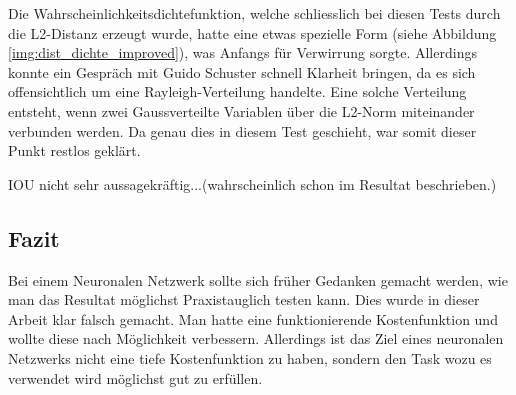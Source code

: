 Die Wahrscheinlichkeitsdichtefunktion, welche schliesslich bei diesen Tests durch die L2-Distanz erzeugt wurde, hatte eine etwas spezielle Form (siehe Abbildung \ref{img:dist_dichte_improved}), was Anfangs für Verwirrung sorgte. 
Allerdings konnte ein Gespräch mit Guido Schuster \cite{PrivateCommunication} schnell Klarheit bringen, da es sich \grqq{}offensichtlich\grqq{} um eine Rayleigh-Verteilung handelte. 
Eine solche Verteilung entsteht, wenn zwei Gaussverteilte Variablen über die L2-Norm miteinander verbunden werden.
Da genau dies in diesem Test geschieht, war somit dieser Punkt restlos geklärt.

IOU nicht sehr aussagekräftig...(wahrscheinlich schon im Resultat beschrieben.)

\subsection{Fazit}
Bei einem Neuronalen Netzwerk sollte sich früher Gedanken gemacht werden, wie man das Resultat möglichst Praxistauglich testen kann.
Dies wurde in dieser Arbeit klar falsch gemacht.
Man hatte eine funktionierende Kostenfunktion und wollte diese nach Möglichkeit verbessern.
Allerdings ist das Ziel eines neuronalen Netzwerks nicht eine tiefe Kostenfunktion zu haben, sondern den Task wozu es verwendet wird möglichst gut zu erfüllen.
